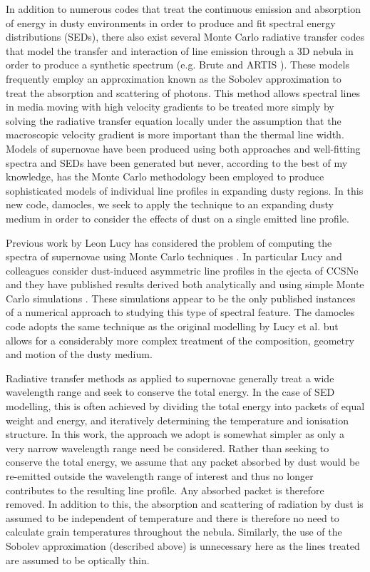 In addition to numerous codes that treat the continuous emission and absorption of energy in dusty environments in order to produce and fit spectral energy distributions (SEDs), there also exist several Monte Carlo radiative transfer codes that model the transfer and interaction of line emission through a 3D nebula in order to produce a synthetic spectrum (e.g. Brute \citep{Thomas2003} and ARTIS \citep{Kromer2009}).  These  models frequently employ an approximation known as the Sobolev approximation \citep{Sobolev1957} to treat the absorption and scattering of photons.  This method allows spectral lines in media moving with high velocity gradients to be treated more simply by solving the radiative transfer equation locally under the assumption that the macroscopic velocity gradient is more important than the thermal line width.  Models of supernovae have been produced using both approaches and well-fitting spectra and SEDs have been generated but never, according to the best of my knowledge, has the Monte Carlo methodology been employed to produce sophisticated models of individual line profiles in expanding dusty regions.  In this new code, {\sc damocles}, we seek to apply the technique to an expanding dusty medium in order to consider the effects of dust on a single emitted line profile.  

Previous work by Leon Lucy has considered the problem of computing the spectra of supernovae using Monte Carlo techniques \citep{Lucy1987,Lucy1999,Lucy2002,Lucy2003,Lucy2005c,Lucy2005b}.  In particular Lucy and colleagues consider dust-induced asymmetric line profiles in the ejecta of CCSNe and they have published results derived both analytically and using simple Monte Carlo simulations \citep{Lucy1989,Lucy1991}.  These simulations appear to be the only published instances of a numerical approach to studying this type of spectral feature.  The {\sc damocles} code adopts the same technique as the original modelling by Lucy et al. but allows for a considerably more complex treatment of the composition, geometry and motion of the dusty medium.

Radiative transfer methods as applied to supernovae generally treat a wide wavelength range and seek to conserve the total energy.  In the case of SED modelling, this is often achieved by dividing the total energy into packets of equal weight and energy, and iteratively determining the temperature and ionisation structure.  In this work, the approach we adopt is somewhat simpler as only a very narrow wavelength range need be considered.  Rather than seeking to conserve the total energy, we assume that any packet absorbed by dust would be re-emitted outside the wavelength range of interest and thus no longer contributes to the resulting line profile.  Any absorbed packet is therefore removed.  In addition to this, the absorption and scattering of radiation by dust is assumed to be independent of temperature and there is therefore no need to calculate grain temperatures throughout the nebula.  Similarly, the use of the Sobolev approximation (described above) is unnecessary here as the lines treated are assumed to be optically thin. 

